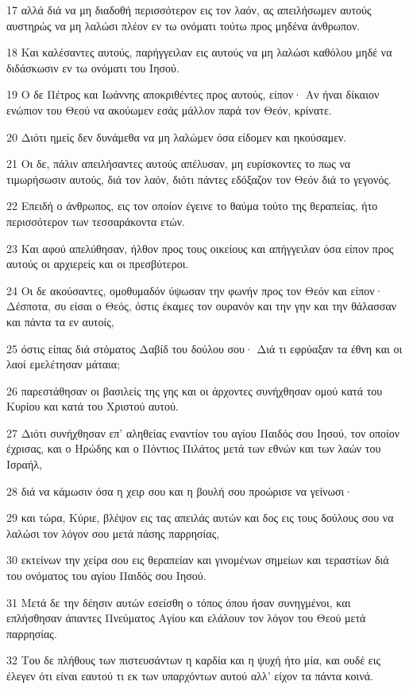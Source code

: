 \par 17 αλλά διά να μη διαδοθή περισσότερον εις τον λαόν, ας απειλήσωμεν αυτούς αυστηρώς να μη λαλώσι πλέον εν τω ονόματι τούτω προς μηδένα άνθρωπον.
\par 18 Και καλέσαντες αυτούς, παρήγγειλαν εις αυτούς να μη λαλώσι καθόλου μηδέ να διδάσκωσιν εν τω ονόματι του Ιησού.
\par 19 Ο δε Πέτρος και Ιωάννης αποκριθέντες προς αυτούς, είπον· Αν ήναι δίκαιον ενώπιον του Θεού να ακούωμεν εσάς μάλλον παρά τον Θεόν, κρίνατε.
\par 20 Διότι ημείς δεν δυνάμεθα να μη λαλώμεν όσα είδομεν και ηκούσαμεν.
\par 21 Οι δε, πάλιν απειλήσαντες αυτούς απέλυσαν, μη ευρίσκοντες το πως να τιμωρήσωσιν αυτούς, διά τον λαόν, διότι πάντες εδόξαζον τον Θεόν διά το γεγονός.
\par 22 Επειδή ο άνθρωπος, εις τον οποίον έγεινε το θαύμα τούτο της θεραπείας, ήτο περισσότερον των τεσσαράκοντα ετών.
\par 23 Και αφού απελύθησαν, ήλθον προς τους οικείους και απήγγειλαν όσα είπον προς αυτούς οι αρχιερείς και οι πρεσβύτεροι.
\par 24 Οι δε ακούσαντες, ομοθυμαδόν ύψωσαν την φωνήν προς τον Θεόν και είπον· Δέσποτα, συ είσαι ο Θεός, όστις έκαμες τον ουρανόν και την γην και την θάλασσαν και πάντα τα εν αυτοίς,
\par 25 όστις είπας διά στόματος Δαβίδ του δούλου σου· Διά τι εφρύαξαν τα έθνη και οι λαοί εμελέτησαν μάταια;
\par 26 παρεστάθησαν οι βασιλείς της γης και οι άρχοντες συνήχθησαν ομού κατά του Κυρίου και κατά του Χριστού αυτού.
\par 27 Διότι συνήχθησαν επ' αληθείας εναντίον του αγίου Παιδός σου Ιησού, τον οποίον έχρισας, και ο Ηρώδης και ο Πόντιος Πιλάτος μετά των εθνών και των λαών του Ισραήλ,
\par 28 διά να κάμωσιν όσα η χειρ σου και η βουλή σου προώρισε να γείνωσι·
\par 29 και τώρα, Κύριε, βλέψον εις τας απειλάς αυτών και δος εις τους δούλους σου να λαλώσι τον λόγον σου μετά πάσης παρρησίας,
\par 30 εκτείνων την χείρα σου εις θεραπείαν και γινομένων σημείων και τεραστίων διά του ονόματος του αγίου Παιδός σου Ιησού.
\par 31 Μετά δε την δέησιν αυτών εσείσθη ο τόπος όπου ήσαν συνηγμένοι, και επλήσθησαν άπαντες Πνεύματος Αγίου και ελάλουν τον λόγον του Θεού μετά παρρησίας.
\par 32 Του δε πλήθους των πιστευσάντων η καρδία και η ψυχή ήτο μία, και ουδέ εις έλεγεν ότι είναι εαυτού τι εκ των υπαρχόντων αυτού αλλ' είχον τα πάντα κοινά.
